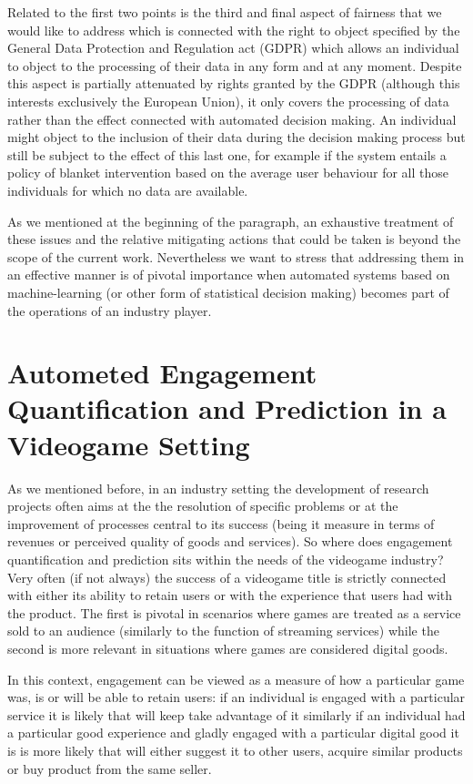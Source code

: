 Related to the first two points is the third and final aspect of fairness that we would like to address which is connected with the right to object specified by the General Data Protection and Regulation act (GDPR) \cite{EUdataregulations2018} which allows an individual to object to the processing of their data in any form and at any moment. Despite this aspect is partially attenuated by rights granted by the GDPR (although this interests exclusively the European Union), it only covers the processing of data rather than the effect connected with automated decision making. An individual might object to the inclusion of their data during the decision making process but still be subject to the effect of this last one, for example if the system entails a policy of blanket intervention based on the average user behaviour for all those individuals for which no data are available.

As we mentioned at the beginning of the paragraph, an exhaustive treatment of these issues and the relative mitigating actions that could be taken is beyond the scope of the current work. Nevertheless we want to stress that addressing them in an effective manner is of pivotal importance when automated systems based on machine-learning (or other form of statistical decision making) becomes part of the operations of an industry player.

\section{Autometed Engagement Quantification and Prediction in a Videogame Setting}
\label{industry_needs}
As we mentioned before, in an industry setting the development of research projects often aims at the the resolution of specific problems or at the improvement of processes central to its success (being it measure in terms of revenues or perceived quality of goods and services). So where does engagement quantification and prediction sits within the needs of the videogame industry? Very often (if not always) the success of a videogame title is strictly connected with either its ability to retain users or with the experience that users had with the product. The first is pivotal in scenarios where games are treated as a service sold to an audience (similarly to the function of streaming services) while the second is more relevant in situations where games are considered digital goods. 

In this context, engagement can be viewed as a measure of how a particular game was, is or will be able to retain users: if an individual is engaged with a particular service it is likely that will keep take advantage of it similarly if an individual had a particular good experience and gladly engaged with a particular digital good it is is more likely that will either suggest it to other users, acquire similar products or buy product from the same seller.  

